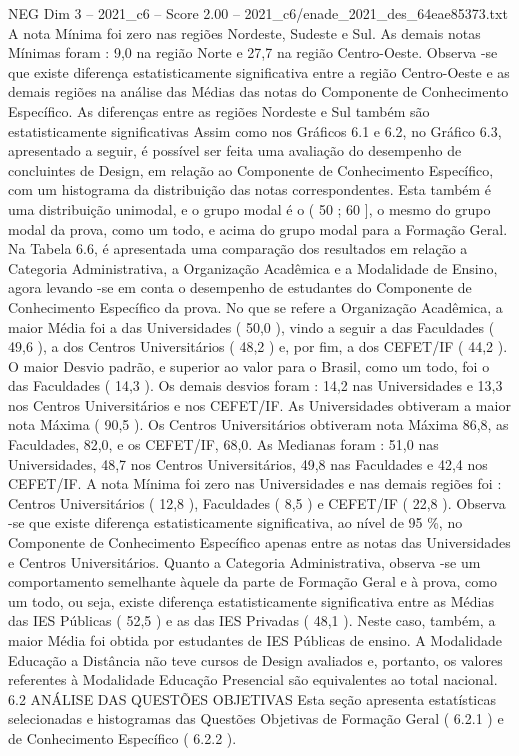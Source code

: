 \begin{textsample}{NEG Dim 3 – 2021\_c6 – Score 2.00 – 2021\_c6/enade\_2021\_des\_64eae85373.txt}
A nota Mínima foi zero nas regiões Nordeste, Sudeste e Sul.
As demais notas Mínimas foram : 9,0 na região Norte e 27,7 na região Centro-Oeste.
Observa -se que existe diferença estatisticamente significativa entre a região Centro-Oeste e as demais regiões na análise das Médias das notas do Componente de Conhecimento Específico.
As diferenças entre as regiões Nordeste e Sul também são estatisticamente significativas Assim como nos Gráficos 6.1 e 6.2, no Gráfico 6.3, apresentado a seguir, é possível ser feita uma avaliação do desempenho de concluintes de Design, em relação ao Componente de Conhecimento Específico, com um histograma da distribuição das notas correspondentes.
Esta também é uma distribuição unimodal, e o grupo modal é o ( 50 ; 60 ], o mesmo do grupo modal da prova, como um todo, e acima do grupo modal para a Formação Geral.
Na Tabela 6.6, é apresentada uma comparação dos resultados em relação a Categoria Administrativa, a Organização Acadêmica e a Modalidade de Ensino, agora levando -se em conta o desempenho de estudantes do Componente de Conhecimento Específico da prova.
No que se refere a Organização Acadêmica, a maior Média foi a das Universidades ( 50,0 ), vindo a seguir a das Faculdades ( 49,6 ), a dos Centros Universitários ( 48,2 ) e, por fim, a dos CEFET/IF ( 44,2 ).
O maior Desvio padrão, e superior ao valor para o Brasil, como um todo, foi o das Faculdades ( 14,3 ).
Os demais desvios foram : 14,2 nas Universidades e 13,3 nos Centros Universitários e nos CEFET/IF.
As Universidades obtiveram a maior nota Máxima ( 90,5 ).
Os Centros Universitários obtiveram nota Máxima 86,8, as Faculdades, 82,0, e os CEFET/IF, 68,0.
As Medianas foram : 51,0 nas Universidades, 48,7 nos Centros Universitários, 49,8 nas Faculdades e 42,4 nos CEFET/IF.
A nota Mínima foi zero nas Universidades e nas demais regiões foi : Centros Universitários ( 12,8 ), Faculdades ( 8,5 ) e CEFET/IF ( 22,8 ).
Observa -se que existe diferença estatisticamente significativa, ao nível de 95 \%, no Componente de Conhecimento Específico apenas entre as notas das Universidades e Centros Universitários.
Quanto a Categoria Administrativa, observa -se um comportamento semelhante àquele da parte de Formação Geral e à prova, como um todo, ou seja, existe diferença estatisticamente significativa entre as Médias das IES Públicas ( 52,5 ) e as das IES Privadas ( 48,1 ).
Neste caso, também, a maior Média foi obtida por estudantes de IES Públicas de ensino.
A Modalidade Educação a Distância não teve cursos de Design avaliados e, portanto, os valores referentes à Modalidade Educação Presencial são equivalentes ao total nacional. 6.2 ANÁLISE DAS QUESTÕES OBJETIVAS Esta seção apresenta estatísticas selecionadas e histogramas das Questões Objetivas de Formação Geral ( 6.2.1 ) e de Conhecimento Específico ( 6.2.2 ).

\end{textsample}
